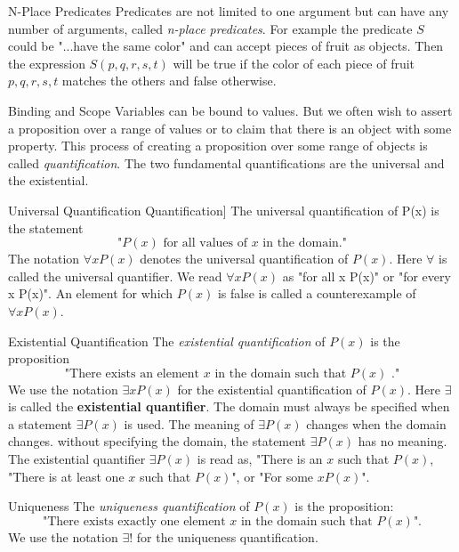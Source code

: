 \documentclass [handout]{beamer}
\begin{document}
\begin{frame}{N-Place Predicates}
Predicates are not limited to one argument but can have any number of arguments, called \textit{n-place predicates}. For example the predicate $S$ could be "...have the same color" and can accept pieces of fruit as objects. Then the expression $S(p,q,r,s,t)$ will be true if the color of each piece of fruit $p,q,r,s,t$ matches the others and false otherwise.

\end{frame}

\begin{frame}{Binding and Scope}
Variables can be bound to values. But we often wish to assert a proposition over a range of values or to claim that there is an object with some property. This process of creating a proposition over some range of objects is called \textit{quantification}. The two fundamental quantifications are the universal and the existential.
\end{frame}

\begin{frame}{Universal Quantification}
Quantification]
The universal quantification of P(x) is the statement 
$$\text{"}P(x) \text{ for all values of }x \text{ in the domain."}$$
The notation $\forall x P(x)$ denotes the universal quantification of $P(x)$. Here $\forall$ is called the universal quantifier. We read $\forall x P(x)$ as "for all x P(x)" or "for every x P(x)". An element for which $P(x)$ is false is called a counterexample of $\forall x P(x)$.
\end{frame}

\begin{frame}{Existential Quantification}
The \textit{existential quantification} of $P(x)$ is the proposition
$$\text{"There exists an element }x \text{ in the domain such that } P(x) \text{ ."}$$
We use the notation $\exists x P(x)$ for the existential quantification of $P(x)$. Here $\exists$ is called the \textbf{existential quantifier}.
The domain must always be specified when a statement $\exists P(x)$ is used. The meaning of $\exists P(x)$ changes when the domain changes. without specifying the domain, the statement $\exists P(x)$ has no meaning. The existential quantifier $\exists P(x)$ is read as, "There is an $x$ such that $P(x)$, "There is at least one $x$ such that $P(x)$", or "For some $x P(x)$".
\end{frame}

\begin{frame}{Uniqueness}
The \textit{uniqueness quantification} of $P(x)$ is the proposition:
$$\text{"There exists exactly one element }x \text{ in the domain such that }P(x)\text{".}$$
We use the notation $\exists !$ for the uniqueness quantification.
\end{frame}
\end{document}
